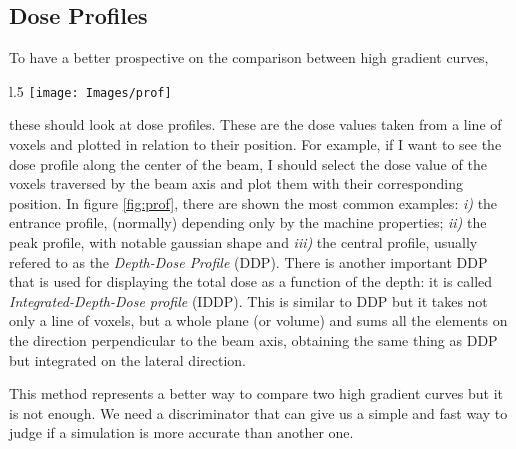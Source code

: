 \documentclass[12pt, a4paper, twoside]{book}
\begin{document}
\subsection{Dose Profiles}
To have a better prospective on the comparison between high gradient curves,
\begin{wrapfigure}{l}{.5\textwidth}
\vspace{-5mm}
{\texttt{[image: Images/prof]}}
\caption{Profiles example}
\label{fig:prof}
\vspace{-5mm}
\end{wrapfigure}
\noindent these should look at dose profiles. 
These are the dose values taken from a line of voxels and plotted in relation to their position. For example, if I want to see the dose profile along the center of the beam, I should select the dose value of the voxels traversed by the beam axis and plot them with their corresponding position.
In figure \ref{fig:prof}, there are shown the most common examples: \emph{i)} the entrance profile, (normally) depending only by the machine properties; \emph{ii)} the peak profile, with notable gaussian shape and \emph{iii)} the central profile, usually refered to as the \emph{Depth-Dose Profile} (DDP). There is another important DDP that is used for displaying the total dose as a function of the depth: it is called \emph{Integrated-Depth-Dose profile} (IDDP). This is similar to DDP but it takes not only a line of voxels, but a whole plane (or volume) and sums all the elements on the direction perpendicular to the beam axis, obtaining the same thing as DDP but integrated on the lateral direction.

This method represents a better way to compare two high gradient curves but it is not enough. We need a discriminator that can give us a simple and fast way to judge if a simulation is more accurate than another one.
\end{document}
